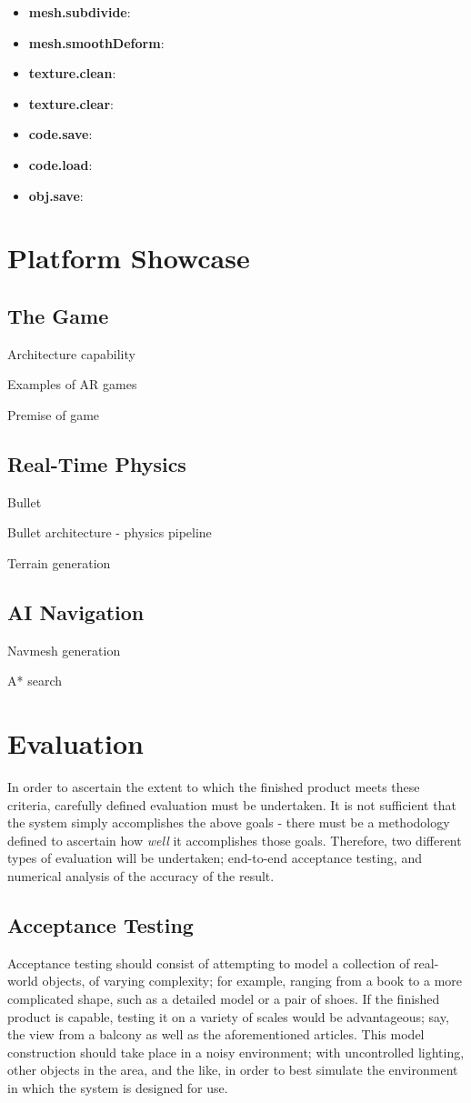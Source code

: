 \documentclass[a4paper,10pt]{article}
\begin{document}
\begin{itemize}
\item{\textbf{mesh.subdivide}:}
\item{\textbf{mesh.smoothDeform}:}
\item{\textbf{texture.clean}:}
\item{\textbf{texture.clear}:}
\item{\textbf{code.save}:}
\item{\textbf{code.load}:}
\item{\textbf{obj.save}:}

\end{itemize}
\section{Platform Showcase}
\subsection{The Game}
Architecture capability

Examples of AR games

Premise of game
\subsection{Real-Time Physics}
Bullet

Bullet architecture - physics pipeline

Terrain generation
\subsection{AI Navigation}
Navmesh generation

A* search

\section{Evaluation}
In order to ascertain the extent to which the finished product meets these criteria, carefully defined evaluation must be undertaken. It is not sufficient that the system simply accomplishes the above goals - there must be a methodology defined to ascertain how \textit{well} it accomplishes those goals. Therefore, two different types of evaluation will be undertaken; end-to-end acceptance testing, and numerical analysis of the accuracy of the result.

\subsection{Acceptance Testing}
Acceptance testing should consist of attempting to model a collection of real-world objects, of varying complexity; for example, ranging from a book to a more complicated shape, such as a detailed model or a pair of shoes. If the finished product is capable, testing it on a variety of scales would be advantageous; say, the view from a balcony as well as the aforementioned articles. This model construction should take place in a noisy environment; with uncontrolled lighting, other objects in the area, and the like, in order to best simulate the environment in which the system is designed for use. 
\end{document}
